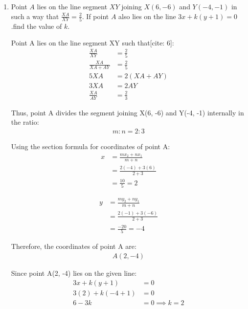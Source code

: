 \begin{enumerate}[label=\thesubsection.\arabic*, ref=\thesubsection.\theenumi]
	Using the property relating the HCF and LCM of two numbers:
	\begin{align*}
		\text{LCM}(a, b) &= \frac{a \times b}{\text{HCF}(a, b)} \\
		\text{LCM}(306, 657) &= \frac{306 \times 657}{9} \\
		&= 34 \times 657 \\
		&= 22338
	\end{align*}

	\item  Point $A$ lies on the line segment $XY$ joining
	$X(6,-6)$ and $Y(-4,-1)$ in such a way that $\frac{XA}{XY}=\frac{2}{5}.$ If point $A$ also lies on the line $3x+k(y+1)=0$.find the value of $k$.
	
	\solution
	Point A lies on the line segment XY such that[cite: 6]:
	\begin{align*}
		\frac{XA}{XY} &= \frac{2}{5} \\
		\frac{XA}{XA + AY} &= \frac{2}{5} \\
		5XA &= 2(XA + AY) \\
		3XA &= 2AY \\
		\frac{XA}{AY} &= \frac{2}{3}
	\end{align*}
	
	Thus, point A divides the segment joining X(6, -6) and Y(-4, -1) internally in the ratio:
	\begin{align*}
		m : n = 2 : 3
	\end{align*}
	
	Using the section formula for coordinates of point A:
	\begin{align*}
		x &= \frac{m x_2 + n x_1}{m + n} \\
		&= \frac{2(-4) + 3(6)}{2 + 3} \\
		&= \frac{10}{5} = 2
	\end{align*}
	
	\begin{align*}
		y &= \frac{m y_2 + n y_1}{m + n} \\
		&= \frac{2(-1) + 3(-6)}{2 + 3} \\
		&= \frac{-20}{5} = -4
	\end{align*}
	
	Therefore, the coordinates of point A are:
	\begin{align*}
		A(2, -4)
	\end{align*}
	
	Since point A(2, -4) lies on the given line:
	\begin{align*}
		3x + k(y + 1) &= 0 \\
		3(2) + k(-4 + 1) &= 0 \\
		6 - 3k &= 0 \implies k = 2
	\end{align*}
	

\end{enumerate}
